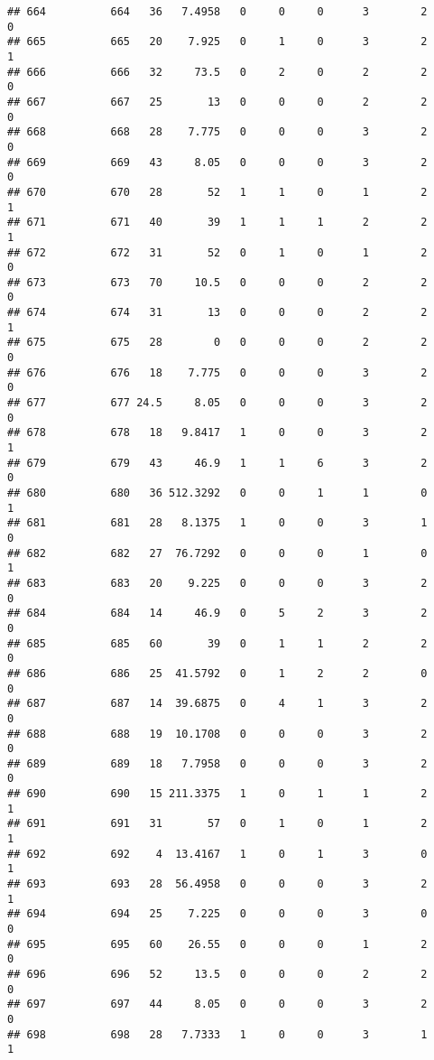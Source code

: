 \documentclass[
]{article}
\begin{document}
\begin{verbatim}
## 664          664   36   7.4958   0     0     0      3        2         0
## 665          665   20    7.925   0     1     0      3        2         1
## 666          666   32     73.5   0     2     0      2        2         0
## 667          667   25       13   0     0     0      2        2         0
## 668          668   28    7.775   0     0     0      3        2         0
## 669          669   43     8.05   0     0     0      3        2         0
## 670          670   28       52   1     1     0      1        2         1
## 671          671   40       39   1     1     1      2        2         1
## 672          672   31       52   0     1     0      1        2         0
## 673          673   70     10.5   0     0     0      2        2         0
## 674          674   31       13   0     0     0      2        2         1
## 675          675   28        0   0     0     0      2        2         0
## 676          676   18    7.775   0     0     0      3        2         0
## 677          677 24.5     8.05   0     0     0      3        2         0
## 678          678   18   9.8417   1     0     0      3        2         1
## 679          679   43     46.9   1     1     6      3        2         0
## 680          680   36 512.3292   0     0     1      1        0         1
## 681          681   28   8.1375   1     0     0      3        1         0
## 682          682   27  76.7292   0     0     0      1        0         1
## 683          683   20    9.225   0     0     0      3        2         0
## 684          684   14     46.9   0     5     2      3        2         0
## 685          685   60       39   0     1     1      2        2         0
## 686          686   25  41.5792   0     1     2      2        0         0
## 687          687   14  39.6875   0     4     1      3        2         0
## 688          688   19  10.1708   0     0     0      3        2         0
## 689          689   18   7.7958   0     0     0      3        2         0
## 690          690   15 211.3375   1     0     1      1        2         1
## 691          691   31       57   0     1     0      1        2         1
## 692          692    4  13.4167   1     0     1      3        0         1
## 693          693   28  56.4958   0     0     0      3        2         1
## 694          694   25    7.225   0     0     0      3        0         0
## 695          695   60    26.55   0     0     0      1        2         0
## 696          696   52     13.5   0     0     0      2        2         0
## 697          697   44     8.05   0     0     0      3        2         0
## 698          698   28   7.7333   1     0     0      3        1         1

\end{verbatim}
\end{document}
